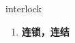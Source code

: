 
\begin{frame}
{\huge interlock}
\begin{center}
\begin{enumerate}\Large
  \item \textbf{连锁，连结}
\end{enumerate}
\end{center}
\end{frame}
